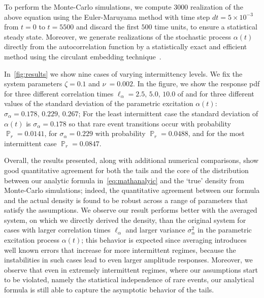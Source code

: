 \documentclass[3p]{elsarticle}
\DeclareMathOperator{\prob}{\mathbb P}
\begin{document}
To perform the Monte-Carlo simulations, we compute  $3000$ realization of the above equation  using the Euler-Maruyama method  with  time step $dt =  5 \times 10^{-3}$ from $t= 0$ to $t = 5500$ and discard the first $500$ time units, to ensure a statistical steady state. Moreover, we generate realizations of  the stochastic process $\alpha(t)$ directly from the autocorrelation function by a statistically exact  and efficient method using the  circulant embedding technique~\cite{2013arXiv1308.0399K}.


In~\cref{fig:results}   we show nine cases of varying intermittency levels. We fix the system parameters $\zeta  = 0.1$ and  $\nu\ = 0.002$. In the figure, we show the response pdf for  three different correlation times $\ell_\alpha = 2.5,\,5.0,\,10.0$ of    and for three different values of the standard deviation of the parametric excitation $\alpha(t)$: $\sigma_\alpha=0.178,\,0.229,\,0.267$; For the least  intermittent case    the standard deviation of $\alpha(t)$ is $\sigma_\alpha = 0.178$ so that  rare event transitions occur with probability $\prob_r = 0.0141$, for  $\sigma_\alpha = 0.229$ with probability $\prob_r = 0.0488$, and for the most intermittent case $\prob_r = 0.0847$. 

Overall, the results presented, along with  additional numerical comparisons, show good  quantitative agreement for both the tails and the core of the distribution  between our analytic formula in~\cref{eq:mathanalyic} and the `true' density from Monte-Carlo simulations; indeed, the quantitative agreement between our formula and the actual density  is  found to be robust  across a range of parameters that satisfy the assumptions. We observe our result performs better with the averaged system, on which we directly derived the density, than the original system for cases with larger correlation times $\ell_\alpha$ and larger variance $\sigma_\alpha^2$ in the parametric excitation process $\alpha(t)$; this behavior is expected  since averaging introduces well known errors that increase for  more intermittent regimes, because   the instabilities in such cases  lead to even larger amplitude responses. Moreover, we observe that even in extremely intermittent regimes, where our  assumptions start to be violated, namely the statistical independence of rare events, our analytical formula is  still able to  capture the asymptotic behavior of the tails.
\end{document}
